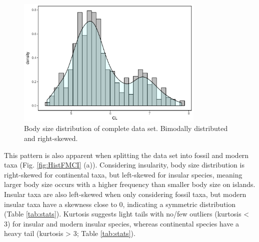 \begin{figure}[htbp]
	\centering
	\includegraphics[width=0.8\textwidth]{MA_JJ_files/figure-latex/HistAll-1.pdf}
	\caption[CL distribution]{Body size distribution of complete data set. Bimodally distributed and right-skewed.}
	\label{fig:histAll}
\end{figure}
This pattern is also apparent when splitting the data set into fossil and modern taxa (Fig. \ref{fig:HistFMCI} (a)). Considering insularity, body size distribution is right-skewed for continental taxa, but left-skewed for insular species, meaning larger body size occurs with a higher frequency than smaller body size on islands. Insular taxa are also left-skewed when only considering fossil taxa, but modern insular taxa have a skewness close to 0, indicating a symmetric distribution (Table \ref{tab:stats}).
Kurtosis suggests light tails with no/few outliers (kurtosis < 3) for insular and modern insular species, whereas continental species have a heavy tail (kurtosis > 3; Table \ref{tab:stats}).

